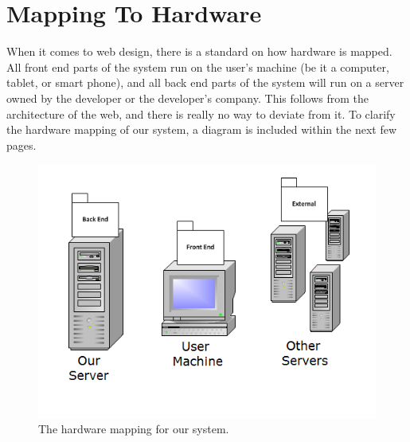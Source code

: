 \section{Mapping To Hardware}
When it comes to web design, there is a standard on how hardware is mapped. All front end parts of the system run on the user's machine (be it a computer, tablet, or smart phone), and all back end parts of the system will run on a server owned by the developer or the developer's company. This follows from the architecture of the web, and there is really no way to deviate from it. To clarify the hardware mapping of our system, a diagram is included within the next few pages.

\begin{figure}[H]
\centering
\includegraphics{./img/hardware.png}
\caption{The hardware mapping for our system.}
\end{figure}